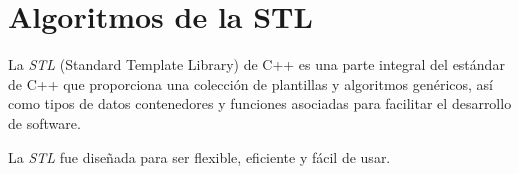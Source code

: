 \chapter{Algoritmos de la STL}

La \textit{STL} (Standard Template Library) de C++ es una parte integral del estándar de C++ que proporciona una colección de plantillas y algoritmos genéricos, así como tipos de datos contenedores y funciones asociadas para facilitar el desarrollo de software.

La \textit{STL} fue diseñada para ser flexible, eficiente y fácil de usar.
